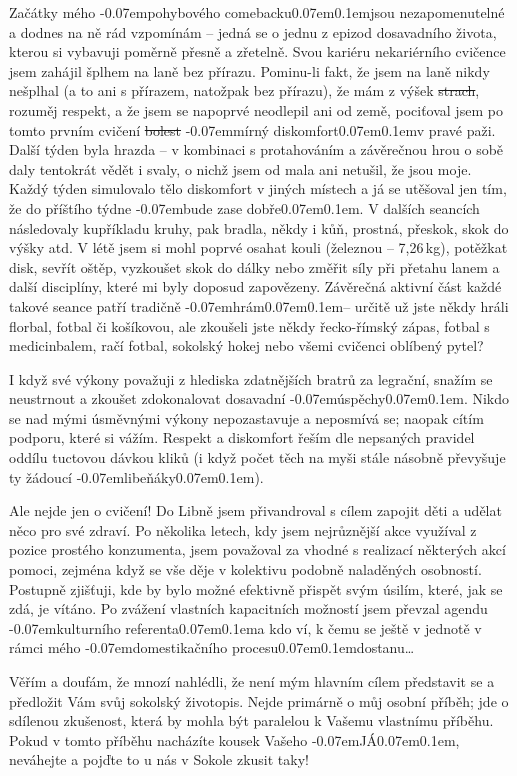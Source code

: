 \documentclass[11pt]{article}
\newcommand{\luv}{\clqq\kern-0.07em}
\newcommand{\ruv}{\kern0.07em\crqq\kern0.1em}
\begin{document}
Začátky mého \luv pohybového comebacku\ruv jsou nezapomenutelné a dodnes na ně rád vzpomínám – jedná se o jednu z epizod dosavadního života, kterou si vybavuji poměrně přesně a zřetelně. Svou kariéru nekariérního cvičence jsem zahájil šplhem na laně bez přírazu. Pominu-li fakt, že jsem na laně nikdy nešplhal (a to ani s přírazem, natožpak bez přírazu), že mám z výšek \sout{strach}, rozuměj respekt, a že jsem se napoprvé neodlepil ani od země, pociťoval jsem po tomto prvním cvičení \sout{bolest} \luv mírný diskomfort\ruv v pravé paži. Další týden byla hrazda – v kombinaci s protahováním a závěrečnou hrou o sobě daly tentokrát vědět i svaly, o nichž jsem od mala ani netušil, že jsou moje. Každý týden simulovalo tělo diskomfort v jiných místech a já se utěšoval jen tím, že do příštího týdne \luv bude zase dobře\ruv. V dalších seancích následovaly kupříkladu kruhy, pak bradla, někdy i kůň, prostná, přeskok, skok do výšky atd. V létě jsem si mohl poprvé osahat kouli (železnou – 7,26\,kg), potěžkat disk, sevřít oštěp, vyzkoušet skok do dálky nebo změřit síly při přetahu lanem a další disciplíny, které mi byly doposud zapovězeny. Závěrečná aktivní část každé takové seance patří tradičně \luv hrám\ruv – určitě už jste někdy hráli florbal, fotbal či košíkovou, ale zkoušeli jste někdy řecko-římský zápas, fotbal s medicinbalem, račí fotbal, sokolský hokej nebo všemi cvičenci oblíbený pytel?

I když své výkony považuji z hlediska zdatnějších bratrů za legrační, snažím se neustrnout a zkoušet zdokonalovat dosavadní \luv úspěchy\ruv. Nikdo se nad mými úsměvnými výkony nepozastavuje a neposmívá se; naopak cítím podporu, které si vážím. Respekt a diskomfort řeším dle nepsaných pravidel oddílu tuctovou dávkou kliků (i když počet těch na myši stále násobně převyšuje ty žádoucí \luv libeňáky\ruv).

Ale nejde jen o cvičení! Do Libně jsem přivandroval s cílem zapojit děti a udělat něco pro své zdraví. Po několika letech, kdy jsem nejrůznější akce využíval z pozice prostého konzumenta, jsem považoval za vhodné s realizací některých akcí pomoci, zejména když se vše děje v kolektivu podobně naladěných osobností. Postupně zjišťuji, kde by bylo možné efektivně přispět svým úsilím, které, jak se zdá, je vítáno. Po zvážení vlastních kapacitních možností jsem převzal agendu \luv kulturního referenta\ruv a kdo ví, k čemu se ještě v jednotě v rámci mého \luv domestikačního procesu\ruv dostanu\ldots{}

Věřím a doufám, že mnozí nahlédli, že není mým hlavním cílem představit se a předložit Vám svůj sokolský životopis. Nejde primárně o můj osobní příběh; jde o sdílenou zkušenost, která by mohla být paralelou k Vašemu vlastnímu příběhu. Pokud v tomto příběhu nacházíte kousek Vašeho \luv JÁ\ruv, neváhejte a pojďte to u nás v Sokole zkusit taky!
\end{document}
